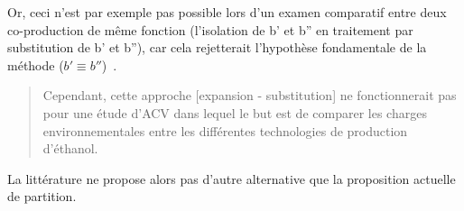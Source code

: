 Or, ceci n'est par exemple pas possible lors d'un examen comparatif entre deux co-production de même fonction (l'isolation de b' et b'' en traitement par substitution de b' et b''), car cela rejetterait l'hypothèse fondamentale de la méthode ($b' \equiv b''$)~\cite{kim_allocation_2002}.
\blockcquote[traduction]{kim_allocation_2002}{
Cependant, cette approche [expansion - substitution] ne fonctionnerait pas pour une étude d'ACV dans lequel le but est de comparer les charges environnementales entre les différentes technologies de production d'éthanol.
}
La littérature ne propose alors pas d'autre alternative que la proposition actuelle de partition.

